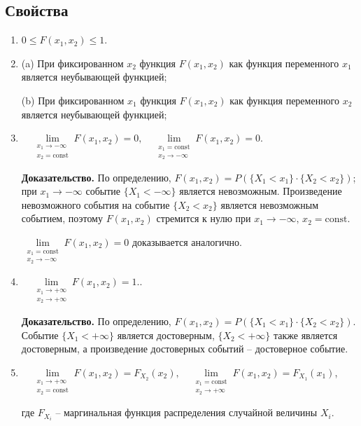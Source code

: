 \subsection*{Свойства}
\begin{enumerate}
	\item $0 \leq F(x_1, x_2) \leq 1$.
	
	\item (a) При фиксированном $x_2$ функция $F(x_1, x_2)$ как функция переменного $x_1$
	является неубывающей функцией;
	
	(b) При фиксированном $x_1$ функция $F(x_1, x_2)$ как функция переменного $x_2$
	является неубывающей функцией;
	
	\item $\quad \lim\limits_{\substack{x_1 \to -\infty \\ x_2 = \text{const}}} F(x_1, x_2) = 0, \quad \lim\limits_{\substack{x_1 = \text{const} \\ x_2 \to -\infty}} F(x_1, x_2) = 0$.
	
		\textbf{Доказательство.} По определению, \( F(x_1, x_2) = P(\{X_1 < x_1\} \cdot \{X_2 < x_2\}) \); при \( x_1 \to -\infty \) событие \(\{X_1 < -\infty\}\) является невозможным. Произведение невозможного события на событие \(\{X_2 < x_2\}\) является невозможным событием, поэтому \( F(x_1, x_2) \) стремится к нулю при \( x_1 \to -\infty, \, x_2 = \text{const} \).
		
		$
		\lim\limits_{\substack{x_1 = \text{const} \\ x_2 \to -\infty}} F(x_1, x_2) = 0
		$ доказывается аналогично.
	
	\item $\quad \lim\limits_{\substack{x_1 \to +\infty \\ x_2 \to +\infty}} F(x_1, x_2) = 1.$.
	
		\textbf{Доказательство.} По определению, \( F(x_1, x_2) = P(\{X_1 < x_1\} \cdot \{X_2 < x_2\}) \). Событие $\{X_1 < +\infty\}$ является достоверным, $\{X_2 < +\infty\}$ также является достоверным, а произведение достоверных событий -- достоверное событие.
		
	\item $\quad \lim\limits_{{\substack{x_1 \to +\infty \\ x_2 = \text{const}}}} F(x_1, x_2) = F_{X_2}(x_2), \quad \lim\limits_{\substack{x_1 = \text{const} \\ x_2 \to +\infty}} F(x_1, x_2) = F_{X_1}(x_1)$, 
	
	где $F_{X_i}$ -- маргинальная функция распределения случайной величины $X_i$.
	

\end{enumerate}
